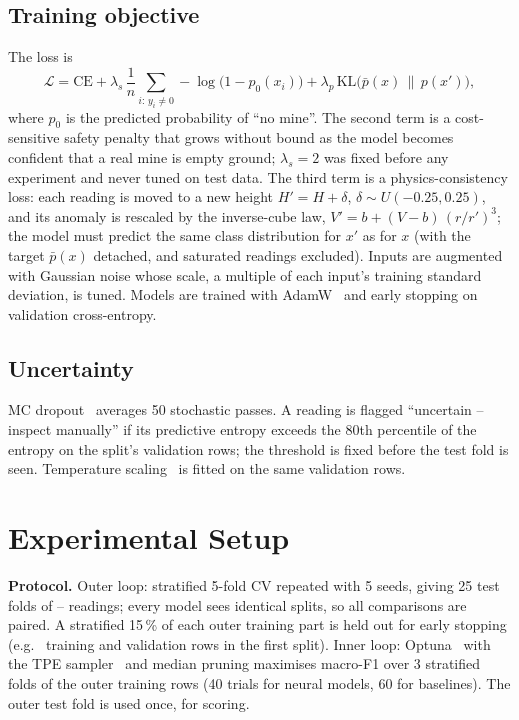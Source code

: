 \documentclass[conference]{IEEEtran}
\begin{document}
\subsection{Training objective}
The loss is
\begin{equation}
\mathcal{L} = \mathrm{CE} + \lambda_{s}\,\frac{1}{n}\!\sum_{i:\,y_i\neq 0}\!-\log\!\big(1-p_0(x_i)\big) + \lambda_{p}\,\mathrm{KL}\big(\bar p(x)\,\|\,p(x')\big),
\end{equation}
where $p_0$ is the predicted probability of ``no mine''. The second term is a cost-sensitive safety penalty that grows without bound as the model becomes confident that a real mine is empty ground; $\lambda_s=2$ was fixed before any experiment and never tuned on test data. The third term is a physics-consistency loss: each reading is moved to a new height $H'=H+\delta$, $\delta\sim U(-0.25,0.25)$, and its anomaly is rescaled by the inverse-cube law, $V'=b+(V-b)\,(r/r')^3$; the model must predict the same class distribution for $x'$ as for $x$ (with the target $\bar p(x)$ detached, and saturated readings excluded). Inputs are augmented with Gaussian noise whose scale, a multiple of each input's training standard deviation, is tuned. Models are trained with AdamW~\cite{loshchilov2019} and early stopping on validation cross-entropy.

\subsection{Uncertainty}
MC dropout~\cite{gal2016} averages 50 stochastic passes. A reading is flagged ``uncertain -- inspect manually'' if its predictive entropy exceeds the 80th percentile of the entropy on the split's validation rows; the threshold is fixed before the test fold is seen. Temperature scaling~\cite{guo2017} is fitted on the same validation rows.

\section{Experimental Setup}
\textbf{Protocol.} Outer loop: stratified 5-fold CV repeated with 5 seeds, giving 25 test folds of \vTestFoldMin--\vTestFoldMax{} readings; every model sees identical splits, so all comparisons are paired. A stratified 15\,\% of each outer training part is held out for early stopping (e.g.\ \vTrainFirst{} training and \vValFirst{} validation rows in the first split). Inner loop: Optuna~\cite{akiba2019} with the TPE sampler~\cite{bergstra2011} and median pruning maximises macro-F1 over 3 stratified folds of the outer training rows (40 trials for neural models, 60 for baselines). The outer test fold is used once, for scoring.
\end{document}
